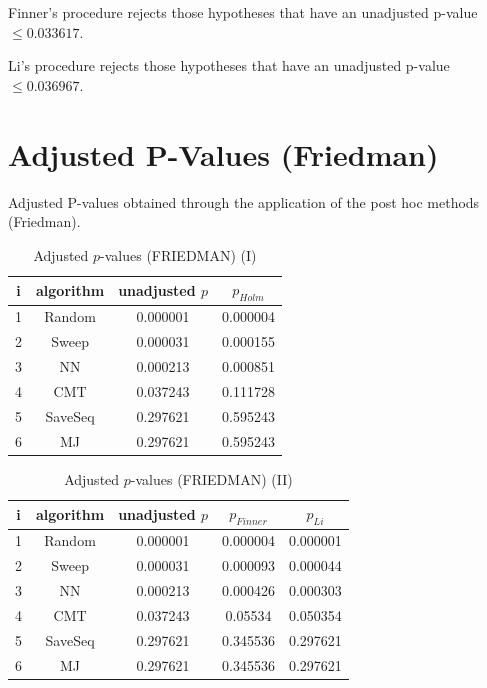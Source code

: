 \documentclass[a4paper,10pt]{article}
\begin{document}
\begin{landscape}
Finner's procedure rejects those hypotheses that have an unadjusted p-value $\le0.033617$.

Li's procedure rejects those hypotheses that have an unadjusted p-value $\le0.036967$.


\newpage

\section{Adjusted P-Values (Friedman)}


Adjusted P-values obtained through the application of the post hoc methods (Friedman).

\begin{table}[!htp]
\centering\small
\begin{tabular}{cccc}
i&algorithm&unadjusted $p$&$p_{Holm}$\\
\hline1&Random&0.000001&0.000004\\2&Sweep&0.000031&0.000155\\3&NN&0.000213&0.000851\\4&CMT&0.037243&0.111728\\5&SaveSeq&0.297621&0.595243\\6&MJ&0.297621&0.595243\\\hline
\end{tabular}
\caption{Adjusted $p$-values (FRIEDMAN) (I)}
\end{table}
\begin{table}[!htp]
\centering\small
\begin{tabular}{ccccc}
i&algorithm&unadjusted $p$&$p_{Finner}$&$p_{Li}$\\
\hline1&Random&0.000001&0.000004&0.000001\\2&Sweep&0.000031&0.000093&0.000044\\3&NN&0.000213&0.000426&0.000303\\4&CMT&0.037243&0.05534&0.050354\\5&SaveSeq&0.297621&0.345536&0.297621\\6&MJ&0.297621&0.345536&0.297621\\\hline
\end{tabular}
\caption{Adjusted $p$-values (FRIEDMAN) (II)}
\end{table}

\newpage
\end{landscape}
\end{document}
